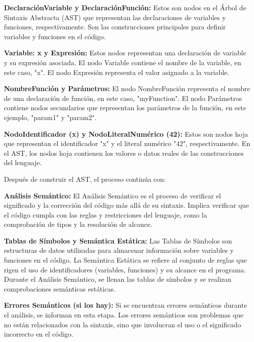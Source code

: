 \documentclass{article}
\begin{document}
\textbf{DeclaraciónVariable y DeclaraciónFunción:}
Estos son nodos en el Árbol de Sintaxis Abstracta (AST) que representan las declaraciones de variables y funciones, respectivamente.
Son las construcciones principales para definir variables y funciones en el código.

\textbf{Variable: x y Expresión:}
Estos nodos representan una declaración de variable y su expresión asociada.
El nodo Variable contiene el nombre de la variable, en este caso, "x".
El nodo Expresión representa el valor asignado a la variable.

\textbf{NombreFunción y Parámetros:}
El nodo NombreFunción representa el nombre de una declaración de función, en este caso, "myFunction".
El nodo Parámetros contiene nodos secundarios que representan los parámetros de la función, en este ejemplo, "param1" y "param2".

\textbf{NodoIdentificador (x) y NodoLiteralNumérico (42):}
Estos son nodos hoja que representan el identificador "x" y el literal numérico "42", respectivamente.
En el AST, los nodos hoja contienen los valores o datos reales de las construcciones del lenguaje.

Después de construir el AST, el proceso continúa con:

\textbf{Análisis Semántico:}
El Análisis Semántico es el proceso de verificar el significado y la corrección del código más allá de su sintaxis.
Implica verificar que el código cumpla con las reglas y restricciones del lenguaje, como la comprobación de tipos y la resolución de alcance.

\textbf{Tablas de Símbolos y Semántica Estática:}
Las Tablas de Símbolos son estructuras de datos utilizadas para almacenar información sobre variables y funciones en el código.
La Semántica Estática se refiere al conjunto de reglas que rigen el uso de identificadores (variables, funciones) y su alcance en el programa.
Durante el Análisis Semántico, se llenan las tablas de símbolos y se realizan comprobaciones semánticas estáticas.

\textbf{Errores Semánticos (si los hay):}
Si se encuentran errores semánticos durante el análisis, se informan en esta etapa.
Los errores semánticos son problemas que no están relacionados con la sintaxis, sino que involucran el uso o el significado incorrecto en el código.
\end{document}
